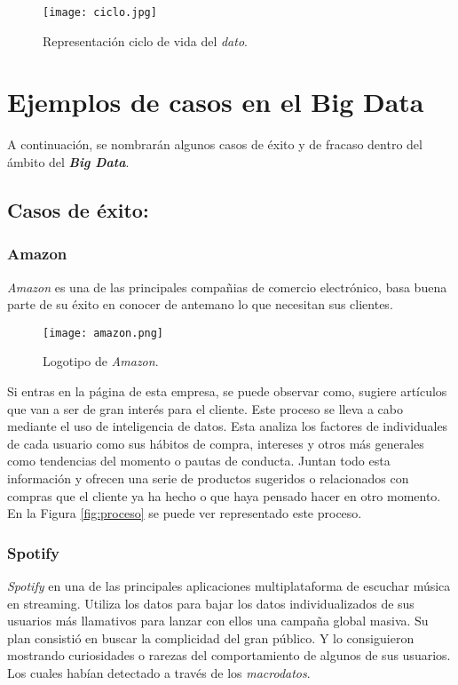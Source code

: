 \documentclass[11pt]{diazessay} %
\begin{document}
\begin{figure}[h!]
	\centering
	\texttt{[image: ciclo.jpg]}
	\caption{Representación ciclo de vida del \textit{dato}.}
	\label{fig:ciclo-dato}
\end{figure}


\newpage
\section*{Ejemplos de casos en el Big Data}
A continuación, se nombrarán algunos casos de éxito y de fracaso dentro del ámbito del \textit{\textbf{Big Data}}.\\

\subsection*{Casos de éxito:}

\subsubsection*{Amazon}
\textit{Amazon} \cite{wiki-amazon} es una de las principales compañias de comercio electrónico, basa buena parte de su éxito en conocer de antemano lo que necesitan sus clientes.

\begin{figure}[h!]
	\centering
	\texttt{[image: amazon.png]}
	\caption{Logotipo de \textit{Amazon}.}
	\label{fig:amazon}
\end{figure}

Si entras en la página de esta empresa, se puede observar como, sugiere artículos que van a ser de gran interés para el cliente. Este proceso se lleva a cabo mediante el uso de inteligencia de datos. Esta analiza los factores de individuales de cada usuario como sus hábitos de compra, intereses y otros más generales como tendencias del momento o pautas de conducta. Juntan todo esta información y ofrecen una serie de productos sugeridos o relacionados con compras que el cliente ya ha hecho o que haya pensado hacer en otro momento.\\
En la Figura \ref{fig:proceso} se puede ver representado este proceso.\\


\subsubsection*{Spotify}
\textit{Spotify} \cite{wiki-spotify} en una de las principales aplicaciones multiplataforma de escuchar música en streaming. Utiliza los datos para bajar los datos individualizados de sus usuarios más llamativos para lanzar con ellos una campaña global masiva. Su plan consistió en buscar la complicidad del gran público. Y lo consiguieron mostrando curiosidades o rarezas del comportamiento de algunos de sus usuarios. Los cuales habían detectado a través de los \textit{macrodatos}.\\
\end{document}
